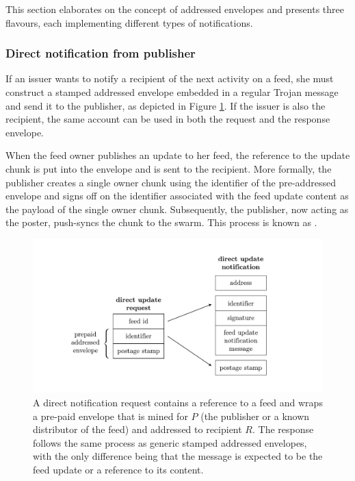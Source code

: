 
This section elaborates on the concept of addressed envelopes and presents three flavours, each implementing different types of notifications.

\subsubsection{Direct notification from publisher}

If an issuer wants to notify a recipient of the next activity on a feed, she must construct a stamped addressed envelope embedded in a regular Trojan message and send it to the publisher, as depicted in Figure \ref{fig:direct-notification}. If the issuer is also the recipient, the same account can be used in both the request and the response envelope. 


When the feed owner publishes an update to her feed, the reference to the update chunk is put into the envelope and is sent to the recipient. More formally, the publisher creates a single owner chunk using the identifier of the pre-addressed envelope and signs off on the identifier associated with the feed update content as the payload of the single owner chunk. Subsequently, the publisher, now acting as the poster, push-syncs the chunk to the swarm. This process is known as . 

\begin{figure}[htbp]
   \centering
   \includegraphics[width=\textwidth]{fig/direct-notification.pdf}
   \caption[Direct notification request and response \statusgreen]{A direct notification request contains a reference to a feed and wraps a pre-paid envelope that is mined for $P$ (the publisher or a known distributor of the feed) and addressed to recipient $R$. The response follows the same process as generic stamped addressed envelopes, with the only difference being that the message is expected to be the feed update or a reference to its content.}
   \label{fig:direct-notification}
\end{figure}


